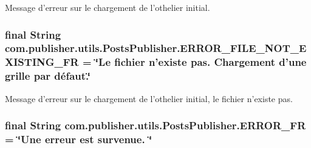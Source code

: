 Message d'erreur sur le chargement de l'othelier initial. \hypertarget{interfacecom_1_1publisher_1_1utils_1_1PostsPublisher_a2aff0928bfa85847bdd4ed7d6e5342e2}{
\subsubsection[{E\-R\-R\-O\-R\-\_\-\-F\-I\-L\-E\-\_\-\-N\-O\-T\-\_\-\-E\-X\-I\-S\-T\-I\-N\-G\-\_\-\-F\-R}]{\setlength{\rightskip}{0pt plus 5cm}final String com.\-publisher.\-utils.\-Posts\-Publisher.\-E\-R\-R\-O\-R\-\_\-\-F\-I\-L\-E\-\_\-\-N\-O\-T\-\_\-\-E\-X\-I\-S\-T\-I\-N\-G\-\_\-\-F\-R = \char`\"{}Le fichier n'existe pas. Chargement d'une grille par défaut.\char`\"{}\hspace{0.3cm}{\ttfamily [static]}}}\label{interfacecom_1_1publisher_1_1utils_1_1PostsPublisher_a2aff0928bfa85847bdd4ed7d6e5342e2}
Message d'erreur sur le chargement de l'othelier initial, le fichier n'existe pas. \hypertarget{interfacecom_1_1publisher_1_1utils_1_1PostsPublisher_a3cb50da369d4eb6b0a062bea57ac917e}{
\subsubsection[{E\-R\-R\-O\-R\-\_\-\-F\-R}]{\setlength{\rightskip}{0pt plus 5cm}final String com.\-publisher.\-utils.\-Posts\-Publisher.\-E\-R\-R\-O\-R\-\_\-\-F\-R = \char`\"{}Une erreur est survenue. \char`\"{}\hspace{0.3cm}{\ttfamily [static]}}}\label{interfacecom_1_1publisher_1_1utils_1_1PostsPublisher_a3cb50da369d4eb6b0a062bea57ac917e}
